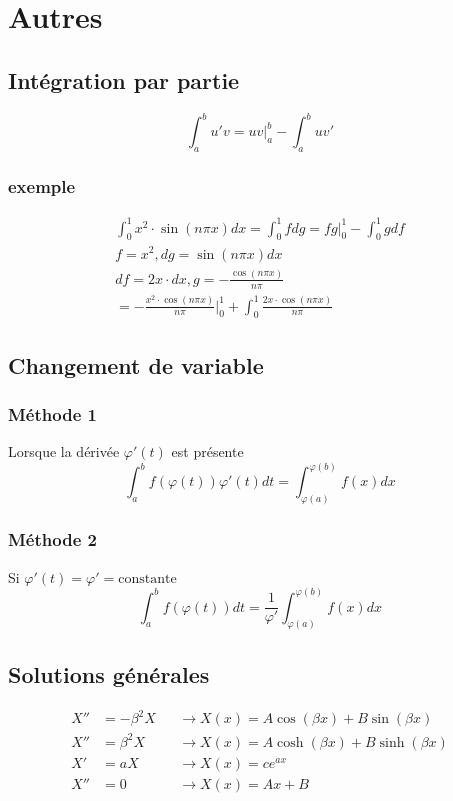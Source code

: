 \documentclass[resume]{subfiles}
\begin{document}
\section{Autres}
\label{sec_autres}
\subsection{Intégration par partie}
$$\int_{a}^{b}u'v=uv\Big|_{a}^{b}-\int_{a}^{b}uv'$$
\subsubsection{exemple}
\begin{align*}
\int_{0}^{1}x^2\cdot \sin(n\pi x)dx=\int_{0}^{1} f dg = fg\Big|_{0}^{1} - \int_{0}^{1} g df \\
f=x^2, dg= \sin(n\pi x)dx\\
df=2x\cdot dx, g = -\frac{\cos(n\pi x)}{n\pi}\\
= -\frac{x^2\cdot \cos(n\pi x)}{n\pi}\Big|_{0}^{1}+\int_{0}^{1} \frac{2x\cdot \cos(n\pi x)}{n\pi}
\end{align*}

\subsection{Changement de variable}
\subsubsection{Méthode 1}
Lorsque la dérivée $\varphi'(t)$ est présente 
$$\int_{a}^{b}f(\varphi(t))\varphi'(t)dt=\int_{\varphi(a)}^{\varphi(b)}f(x)dx$$
\subsubsection{Méthode 2}
Si $\varphi'(t)=\varphi'=\text{constante}$
$$\int_{a}^{b}f(\varphi(t))dt=\frac{1}{\varphi'}\int_{\varphi(a)}^{\varphi(b)}f(x)dx$$
\subsection{Solutions générales}
\begin{align*}
X''&=-\beta^2 X&&\longrightarrow X(x)=A\cos(\beta x)+B\sin(\beta x)\\
X''&=\beta^2 X&&\longrightarrow X(x)=A\cosh(\beta x)+B\sinh(\beta x)\\
X' & =a X & & \longrightarrow X(x)=ce^{ax}\\
X''&=0 &&\longrightarrow X(x)=Ax+B
\end{align*}
\end{document}
